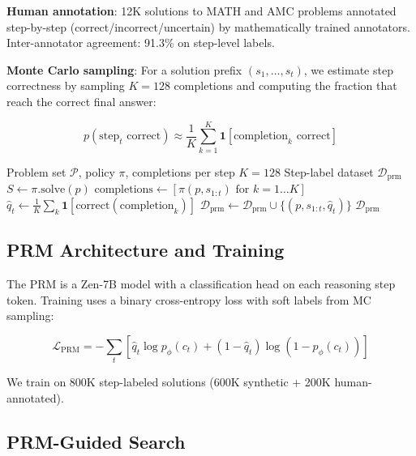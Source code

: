 \documentclass[11pt,a4paper]{article}
\begin{document}
\textbf{Human annotation}: 12K solutions to MATH and AMC problems annotated
step-by-step (correct/incorrect/uncertain) by mathematically trained annotators.
Inter-annotator agreement: 91.3\% on step-level labels.

\textbf{Monte Carlo sampling}: For a solution prefix $(s_1, \ldots, s_t)$, we estimate
step correctness by sampling $K=128$ completions and computing the fraction that
reach the correct final answer:

\begin{equation}
p(\text{step}_t \text{ correct}) \approx \frac{1}{K}\sum_{k=1}^K \mathbf{1}[\text{completion}_k \text{ correct}]
\end{equation}

\begin{algorithm}[H]
\caption{Monte Carlo PRM Data Generation}
\begin{algorithmic}[1]
\REQUIRE Problem set $\mathcal{P}$, policy $\pi$, completions per step $K=128$
\ENSURE Step-label dataset $\mathcal{D}_\text{prm}$
  \STATE $S \leftarrow \pi.\text{solve}(p)$ 
    \STATE $\text{completions} \leftarrow [\pi(p, s_{1:t}) \text{ for } k=1\ldots K]$
    \STATE $\hat{q}_t \leftarrow \frac{1}{K}\sum_k \mathbf{1}[\text{correct}(\text{completion}_k)]$
    \STATE $\mathcal{D}_\text{prm} \leftarrow \mathcal{D}_\text{prm} \cup \{(p, s_{1:t}, \hat{q}_t)\}$
  \ENDFOR
\ENDFOR
\RETURN $\mathcal{D}_\text{prm}$
\end{algorithmic}
\end{algorithm}

\subsection{PRM Architecture and Training}

The PRM is a Zen-7B model with a classification head on each reasoning step token.
Training uses a binary cross-entropy loss with soft labels from MC sampling:

\begin{equation}
\mathcal{L}_\text{PRM} = -\sum_{t} \left[\hat{q}_t \log p_\phi(c_t) + (1-\hat{q}_t)\log(1-p_\phi(c_t))\right]
\end{equation}

We train on 800K step-labeled solutions (600K synthetic + 200K human-annotated).

\subsection{PRM-Guided Search}
\end{document}
